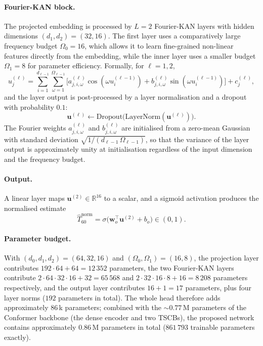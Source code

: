 \documentclass[a4paper,fleqn]{cas-dc}
\begin{document}
\paragraph{Fourier-KAN block.} The projected embedding is processed by
$L=2$ Fourier-KAN layers with hidden dimensions $(d_{1},d_{2})=(32,16)$.
The first layer uses a comparatively large frequency budget
$\Omega_{0}=16$, which allows it to learn fine-grained non-linear
features directly from the embedding, while the inner layer uses a
smaller budget $\Omega_{1}=8$ for parameter efficiency. Formally, for
$\ell=1,2$,
\begin{equation}\label{eq:fourier_block}
  u^{(\ell)}_j = \sum_{i=1}^{d_{\ell-1}}\sum_{\omega=1}^{\Omega_{\ell-1}}
    \bigl[a^{(\ell)}_{j,i,\omega}\cos(\omega u^{(\ell-1)}_i)
        + b^{(\ell)}_{j,i,\omega}\sin(\omega u^{(\ell-1)}_i)\bigr]
    + c^{(\ell)}_j,
\end{equation}
and the layer output is post-processed by a layer normalisation and a
dropout with probability $0.1$:
\begin{equation}\label{eq:fourier_post}
  \mathbf{u}^{(\ell)} \leftarrow \mathrm{Dropout}\bigl(
    \mathrm{LayerNorm}(\mathbf{u}^{(\ell)})\bigr).
\end{equation}
The Fourier weights $a^{(\ell)}_{j,i,\omega}$ and $b^{(\ell)}_{j,i,\omega}$
are initialised from a zero-mean Gaussian with standard deviation
$\sqrt{1/(d_{\ell-1}\,\Omega_{\ell-1})}$, so that the variance of the
layer output is approximately unity at initialisation regardless of the
input dimension and the frequency budget.

\paragraph{Output.} A linear layer maps $\mathbf{u}^{(2)}\in
\mathbb{R}^{16}$ to a scalar, and a sigmoid activation produces the
normalised estimate
\begin{equation}\label{eq:t60_hat}
  \hat{T}_{60}^{\mathrm{norm}} = \sigma\bigl(\mathbf{w}_{o}^{\top}\mathbf{u}^{(2)}
                                            + b_{o}\bigr) \in (0,1).
\end{equation}

\paragraph{Parameter budget.} With $(d_{0},d_{1},d_{2})=(64,32,16)$ and
$(\Omega_{0},\Omega_{1})=(16,8)$, the projection layer contributes
$192\cdot 64+64=12\,352$ parameters, the two Fourier-KAN layers
contribute $2\cdot 64\cdot 32\cdot 16+32 = 65\,568$ and
$2\cdot 32\cdot 16\cdot 8 + 16 = 8\,208$ parameters respectively, and
the output layer contributes $16+1=17$ parameters, plus four layer
norms ($192$ parameters in total). The whole head therefore adds
approximately $86$\,k parameters; combined with the $\sim 0.77$\,M
parameters of the Conformer backbone (the dense encoder and two TSCBs),
the proposed network contains approximately $0.86$\,M parameters in
total ($861\,793$ trainable parameters exactly).
\end{document}
